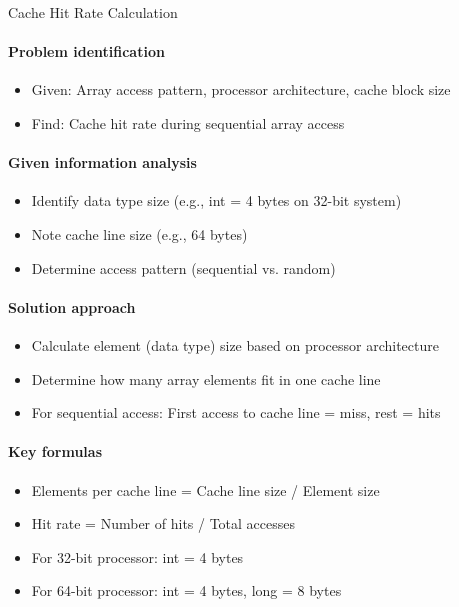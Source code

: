 \begin{KR}{Cache Hit Rate Calculation}
    \paragraph{Problem identification}
    \begin{itemize}
        \item Given: Array access pattern, processor architecture, cache block size
        \item Find: Cache hit rate during sequential array access
    \end{itemize}

    \paragraph{Given information analysis}
    \begin{itemize}
        \item Identify data type size (e.g., int = 4 bytes on 32-bit system)
        \item Note cache line size (e.g., 64 bytes)
        \item Determine access pattern (sequential vs. random)
    \end{itemize}
    
    \paragraph{Solution approach}
    \begin{itemize}
        \item Calculate element (data type) size based on processor architecture
        \item Determine how many array elements fit in one cache line
        \item For sequential access: First access to cache line = miss, rest = hits
    \end{itemize}
    
    \paragraph{Key formulas}
    \begin{itemize}
        \item Elements per cache line = Cache line size / Element size
        \item Hit rate = Number of hits / Total accesses
        \item For 32-bit processor: int = 4 bytes
        \item For 64-bit processor: int = 4 bytes, long = 8 bytes
    \end{itemize}
\end{KR}

